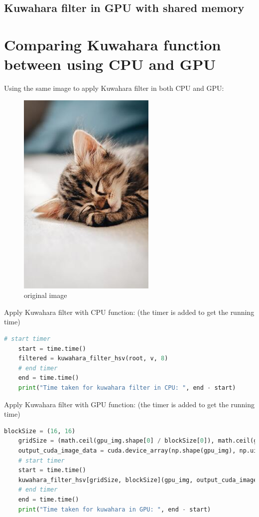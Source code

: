 \documentclass{article}
\begin{document}
\subsection{Kuwahara filter in GPU with shared memory}
\newpage
\section{Comparing Kuwahara function between using CPU and GPU}

Using the same image to apply Kuwahara filter in both CPU and GPU:

    \begin{figure}
        \centering
        \includegraphics{cute-cat.jpg}
        \caption{original image}
        \label{fig:figure1}
    \end{figure}

Apply Kuwahara filter with CPU function: (the timer is added to get the running time)

    \begin{lstlisting}[language=Python]
    # start timer
    start = time.time()
    filtered = kuwahara_filter_hsv(root, v, 8)
    # end timer
    end = time.time()
    print("Time taken for kuwahara filter in CPU: ", end - start)
    \end{lstlisting}

Apply Kuwahara filter with GPU function: (the timer is added to get the running time)

    \begin{lstlisting}[language=Python]
    blockSize = (16, 16)
    gridSize = (math.ceil(gpu_img.shape[0] / blockSize[0]), math.ceil(gpu_img.shape[1] / blockSize[1]))
    output_cuda_image_data = cuda.device_array(np.shape(gpu_img), np.uint8)
    # start timer
    start = time.time()
    kuwahara_filter_hsv[gridSize, blockSize](gpu_img, output_cuda_image_data, v, 8)
    # end timer
    end = time.time()
    print("Time taken for kuwahara in GPU: ", end - start)
    \end{lstlisting}
\end{document}
